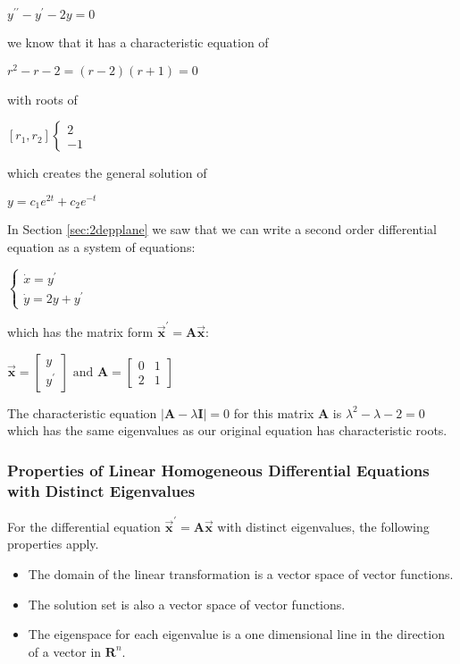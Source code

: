 \documentclass[12pt,landscape,twocolumn]{article}
\newcommand{\ma}[0]{\mathbf{A} }        %
\let\oldvec\vec
\renewcommand{\vec}[1]{\oldvec{\mathbf{ #1 } } }                    %
\begin{document}
        $ y^{\prime\prime} - y ^\prime - 2y = 0 $

    we know that it has a characteristic equation of

        $ r^2 - r - 2 = (r - 2)(r + 1) = 0 $

    with roots of

        $
            [r_1, r_2]
            \begin{cases}
                2\\
                -1
            \end{cases}
        $

    which creates the general solution of

        $ y = c_1 e^{2t} + c_2 e^{-t} $

    In Section \ref{sec:2depplane} we saw that we can write a second order differential equation as a system of equations:

        $ \begin{cases}
            \dot{x} = y^\prime\\
            \dot{y} = 2y + y^\prime
        \end{cases} $

        which has the matrix form $\vec{x}^\prime = \ma \vec{x}$:

        $ \vec{x} = \left[ \begin{array}{r}
            y\\
            y^\prime
        \end{array} \right] \text{ and }
        \ma = \left[ \begin{array}{rr}
            0 & 1\\
            2 & 1
        \end{array} \right] $

    The characteristic equation $| \ma - \lambda \mathbf{I} | = 0$ for this matrix $\ma$ is $\lambda^2 - \lambda - 2 = 0$ which has the same eigenvalues as our original equation has characteristic roots.

        \subsubsection{Properties of Linear Homogeneous Differential Equations with Distinct Eigenvalues}
        For the differential equation $\vec{x}^\prime = \ma\vec{x}$ with distinct eigenvalues, the following properties apply.
            \begin{itemize}
                \item The domain of the linear transformation is a vector space of vector functions.
                \item The solution set is also a vector space of vector functions.
                \item The eigenspace for each eigenvalue is a one dimensional line in the direction of a vector in $\mathbf{R}^n$.
            \end{itemize}
\end{document}
